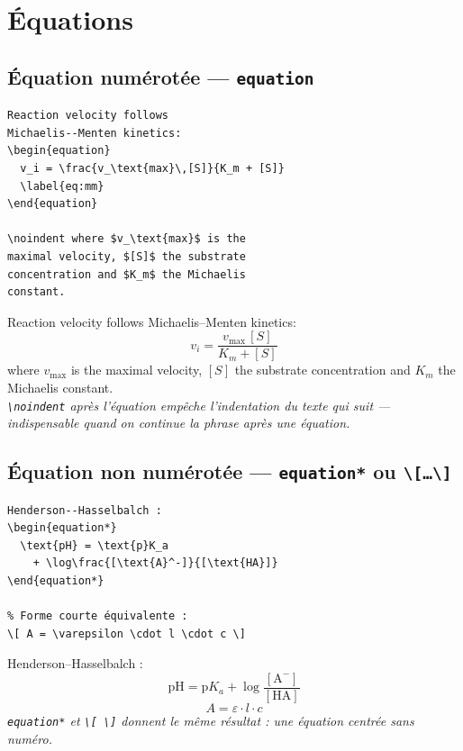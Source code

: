 \documentclass[12pt, a4paper]{article}
\begin{document}
\section{Équations}

\subsection{Équation numérotée — \texttt{equation}}

\begin{demo}
\begin{lstlisting}[style=latexcode]
Reaction velocity follows
Michaelis--Menten kinetics:
\begin{equation}
  v_i = \frac{v_\text{max}\,[S]}{K_m + [S]}
  \label{eq:mm}
\end{equation}

\noindent where $v_\text{max}$ is the
maximal velocity, $[S]$ the substrate
concentration and $K_m$ the Michaelis
constant.
\end{lstlisting}
\tcblower
Reaction velocity follows Michaelis--Menten kinetics:
\[
  v_i = \frac{v_{\text{max}}\,[S]}{K_m + [S]}
\]
\noindent where $v_{\text{max}}$ is the maximal velocity, $[S]$ the substrate concentration and $K_m$ the Michaelis constant.\\[6pt]
{\footnotesize\itshape \texttt{\textbackslash noindent} après l'équation empêche l'indentation du texte qui suit — indispensable quand on continue la phrase après une équation.}
\end{demo}

\subsection[Équation non numérotée]{Équation non numérotée — \texttt{equation*} ou \texttt{\textbackslash[\ldots\textbackslash]}}

\begin{demo}
\begin{lstlisting}[style=latexcode]
Henderson--Hasselbalch :
\begin{equation*}
  \text{pH} = \text{p}K_a
    + \log\frac{[\text{A}^-]}{[\text{HA}]}
\end{equation*}

% Forme courte équivalente :
\[ A = \varepsilon \cdot l \cdot c \]
\end{lstlisting}
\tcblower
Henderson--Hasselbalch :
\[
  \text{pH} = \text{p}K_a + \log\frac{[\text{A}^-]}{[\text{HA}]}
\]
\[ A = \varepsilon \cdot l \cdot c \]
{\footnotesize\itshape \texttt{equation*} et \texttt{\textbackslash[\,\textbackslash]} donnent le même résultat : une équation centrée sans numéro.}
\end{demo}
\end{document}
